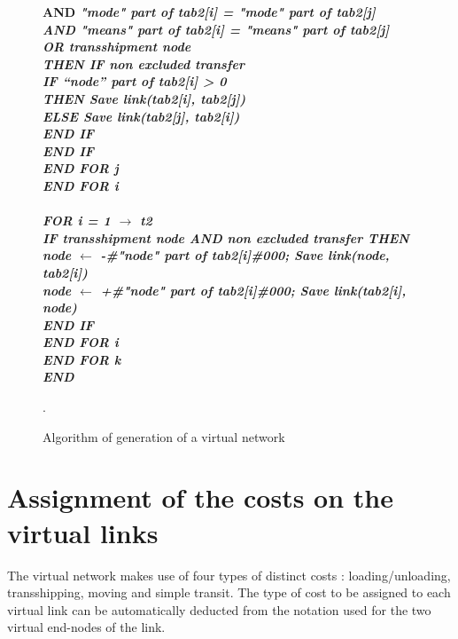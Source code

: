 \begin{center}
\begin{figure}[htbp]
{\begin{minipage}{20cm}
\begin{tabbing}
\> \> \> \> \bf{AND} \it{"mode" part of tab2[i] = "mode" part of tab2[j]}\\
\> \> \> \> \bf{AND} \it{"means" part of tab2[i] = "means" part of tab2[j]}\\
\> \> \> \bf{OR} \it{transshipment node}\\
\> \> \> \> \> \bf{THEN IF} \it {non excluded transfer}\\
\> \> \> \> \> \> \bf{IF} \it{``node'' part of tab2[i] > 0}\\ 
\> \> \> \> \> \> \> \bf{THEN} {Save link(tab2[i], tab2[j])}\\
\> \> \> \> \> \> \> \bf{ELSE} {Save link(tab2[j], tab2[i])}\\
\> \> \> \> \> \> \bf{END IF}\\
\> \> \> \bf{END IF}\\
\> \> \bf{END FOR} j\\
\> \bf {END FOR} i\\
\\
\> \bf{FOR} i = 1 $\rightarrow$ t2\\
\> \> \bf{IF} \it{transshipment node} \bf{AND} \it{non excluded transfer} \bf{THEN}\\
\> \> \> node $\leftarrow$ -\#\it{"node" part of tab2[i]\#000}; \it{Save link(node, tab2[i])}\\
\> \> \> node $\leftarrow$ +\#\it{"node" part of tab2[i]\#000}; \it{Save link(tab2[i], node)}\\
\> \> \bf{END IF}\\
\> \bf{END FOR} i\\
\bf {END FOR} k\\
\bf {END}
\end{tabbing}
\end{minipage}
.}
\caption{\label{algo4} Algorithm of generation of a virtual network}
\end{figure}
\end{center}




\section{Assignment of the costs on the virtual links}


The virtual network makes use of four types of distinct costs : loading/unloading,
transshipping, moving and simple transit.  The type of cost to be assigned to
each virtual link can be automatically deducted from the notation used for the
two virtual end-nodes of the link.

